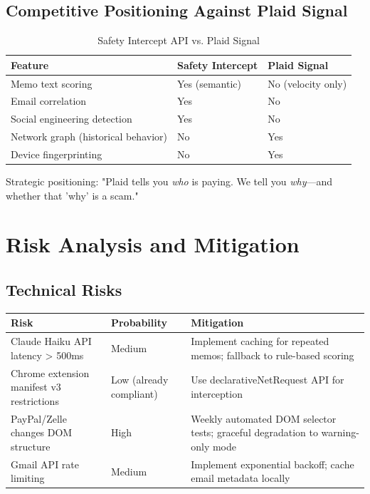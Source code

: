 \documentclass[12pt]{article}
\begin{document}
\subsection{Competitive Positioning Against Plaid Signal}

\begin{table}[H]
\centering
\caption{Safety Intercept API vs. Plaid Signal}
\begin{tabular}{|l|l|l|}
\hline
\textbf{Feature} & \textbf{Safety Intercept} & \textbf{Plaid Signal} \\
\hline
Memo text scoring & Yes (semantic) & No (velocity only) \\
\hline
Email correlation & Yes & No \\
\hline
Social engineering detection & Yes & No \\
\hline
Network graph (historical behavior) & No & Yes \\
\hline
Device fingerprinting & No & Yes \\
\hline
\end{tabular}
\end{table}

Strategic positioning: "Plaid tells you \textit{who} is paying. We tell you \textit{why}—and whether that 'why' is a scam."

\newpage
\section{Risk Analysis and Mitigation}

\subsection{Technical Risks}

\begin{longtable}{|p{}|p{}|p{}|}
\hline
\textbf{Risk} & \textbf{Probability} & \textbf{Mitigation} \\
\hline
Claude Haiku API latency > 500ms & Medium & Implement caching for repeated memos; fallback to rule-based scoring \\
\hline
Chrome extension manifest v3 restrictions & Low (already compliant) & Use declarativeNetRequest API for interception \\
\hline
PayPal/Zelle changes DOM structure & High & Weekly automated DOM selector tests; graceful degradation to warning-only mode \\
\hline
Gmail API rate limiting & Medium & Implement exponential backoff; cache email metadata locally \\
\hline
\end{longtable}
\end{document}
